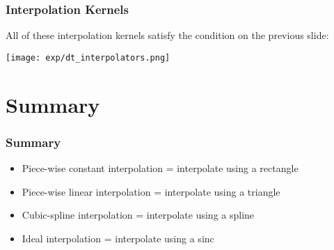 \documentclass{beamer}
\begin{document}
\begin{frame}
  \frametitle{Interpolation Kernels}
  All of these interpolation kernels satisfy the condition on the previous slide:
  
  \centerline{\texttt{[image: exp/dt\_interpolators.png]}}  
\end{frame}

\section[Summary]{Summary}
\setcounter{subsection}{1}

\begin{frame}
  \frametitle{Summary}
  \begin{itemize}
  \item Piece-wise constant interpolation = interpolate using a rectangle
  \item Piece-wise linear interpolation = interpolate using a triangle
  \item Cubic-spline interpolation = interpolate using a spline
  \item Ideal interpolation = interpolate using a sinc
  \end{itemize}
\end{frame}
\end{document}

